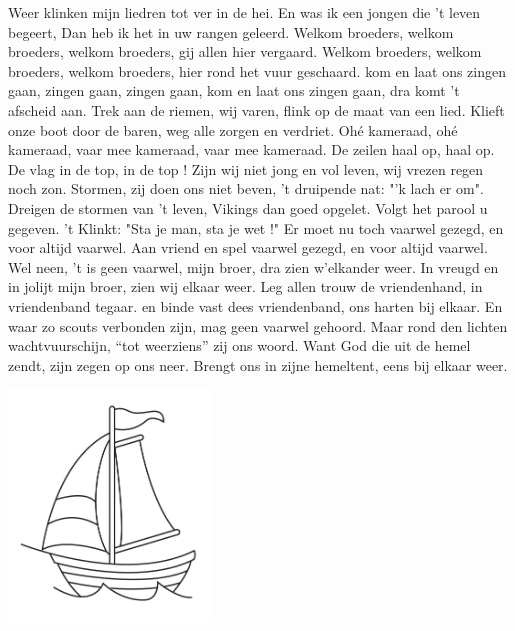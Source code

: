 \documentclass{article}
\begin{document}
\begin{songs}{}
Weer klinken mijn liedren tot ver in de hei.
En was ik een jongen die ’t leven begeert,
Dan heb ik het in uw rangen geleerd.
\endverse
\endsong
{}
\beginverse*
Welkom broeders, welkom broeders,
welkom broeders, gij allen hier vergaard.
Welkom broeders, welkom broeders,
welkom broeders, hier rond het vuur geschaard.
\endverse 
\beginverse*
kom en laat ons zingen gaan,
zingen gaan, zingen gaan,
kom en laat ons zingen gaan,
dra komt 't afscheid aan.
\endverse 
\endsong 
{}
\beginverse*
Trek aan de riemen, wij varen,
flink op de maat van een lied.
Klieft onze boot door de baren,
weg alle zorgen en verdriet.
\endverse
\beginchorus
Ohé kameraad, ohé kameraad,
vaar mee kameraad, vaar mee kameraad.
De zeilen haal op, haal op.
De vlag in de top, in de top ! 
\endchorus
\beginverse*
Zijn wij niet jong en vol leven,
wij vrezen regen noch zon.
Stormen, zij doen ons niet beven,
't druipende nat: "'k lach er om".
\endverse
\beginverse*
Dreigen de stormen van 't leven,
Vikings dan goed opgelet.
Volgt het parool u gegeven.
't Klinkt: "Sta je man, sta je wet !"
\endverse
\endsong
{}
\beginverse*
Er moet nu toch vaarwel gezegd,
en voor altijd vaarwel.
Aan vriend en spel vaarwel gezegd,
en voor altijd vaarwel.
\endverse
\beginchorus
Wel neen, 't is geen vaarwel,
mijn broer, dra zien w’elkander weer.
In vreugd en in jolijt mijn broer,
zien wij elkaar weer.
\endchorus
\beginverse*
Leg allen trouw de vriendenhand,
in vriendenband tegaar.
en binde vast dees vriendenband,
ons harten bij elkaar.
\endverse
\beginverse*
En waar zo scouts verbonden zijn,
mag geen vaarwel gehoord.
Maar rond den lichten wachtvuurschijn,
“tot weerziens” zij ons woord.
\endverse
\beginverse*
Want God die uit de hemel zendt, zijn zegen op ons neer.
Brengt ons in zijne hemeltent,
eens bij elkaar weer.
\endverse
\endsong 
\begin{intersong}
    \includegraphics[width=0.4\textwidth]{vaarmaarmeekameraad}

\end{intersong}
\end{songs}
\end{document}
